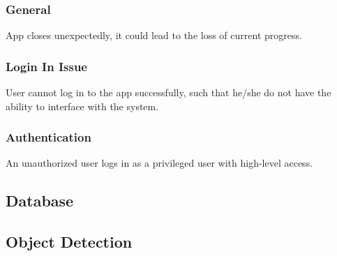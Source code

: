 \documentclass{article}
\begin{document}
\subsubsection{General}
App closes unexpectedly, it could lead to the loss of current progress.
\subsubsection{Login In Issue}
User cannot log in to the app successfully, such that he/she do not have the ability to interface with the system.
\subsubsection{Authentication}
An unauthorized user logs in as a privileged user with high-level access.

\subsection{Database}
\subsection{Object Detection}
\end{document}
